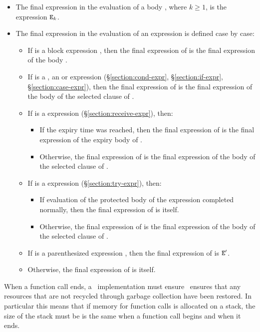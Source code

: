 \begin{itemize}
\item The final expression in the evaluation of a body , where
$k\geq1$, is the expression ${\tt{\sl E}}_k$.
\item The final expression in the evaluation of an expression  is defined case by case:
\begin{itemize}
\item If  is a block expression , then the final expression of
 is the final expression of the body .
\item If  is \ifStd a , \else an \fi
{} or  expression (\ifStd\S\ref{section:cond-expr},\fi
\S\ref{section:if-expr}, \S\ref{section:case-expr}), then
the final expression of
 is the final expression of the body of the selected clause of .
\item If  is a  expression (\S\ref{section:receive-expr}), then:
\begin{itemize}
\item If the expiry time was reached, then 
the final expression of  is the final expression of the expiry body of .
\item Otherwise,
the final expression of
 is the final expression of the body of the selected clause of .
\end{itemize}
\ifStd
\item If  is a  expression (\S\ref{section:try-expr}), then:
\begin{itemize}
\item If evaluation of the protected body of the  expression completed normally, then 
the final expression of
 is  itself.
\item Otherwise,
the final expression of
 is the final expression of the body of the selected clause of .
\end{itemize}
\fi
\item If  is a parenthesized expression , then the final expression of
 is ${\tt{\sl E}}'$.
\item Otherwise, the final expression of  is  itself.
\end{itemize}
\end{itemize}

When a function call ends,
\ifStd a \StdErlang\ implementation must ensure \fi
\ifOld \Erlang\ ensures \fi
that any resources that are not recycled through garbage collection
have been restored.  In particular this means that if memory for
function calls is allocated on a stack, the size of the stack
\ifStd must be \fi
\ifOld is \fi
the same when a function call begins and when it ends.

